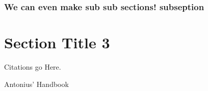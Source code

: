 \documentclass[11pt]{article}
\begin{document}
\subsubsection{We can even make sub sub sections! subseption}

\section{Section Title 3}





\begin{thebibliography}{9}
	{\footnotesize
	 Citations go Here.	
		
	 Antonius' Handbook 
	}
\end{thebibliography}


\end{document}
